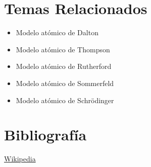 \documentclass[12pt,a4paper]{article}
\begin{document}
\section{Temas Relacionados}

\begin{itemize}
\item Modelo atómico de Dalton
\item Modelo atómico de Thompson
\item Modelo atómico de Rutherford
\item Modelo atómico de Sommerfeld
\item Modelo atómico de Schr\"odinger
\end{itemize}

\section{Bibliografía}
\href{<https://es.wikipedia.org/wiki/Modelo_at\%C3\%B3mico_de_Bohr>}{Wikipedia}
\end{document}
